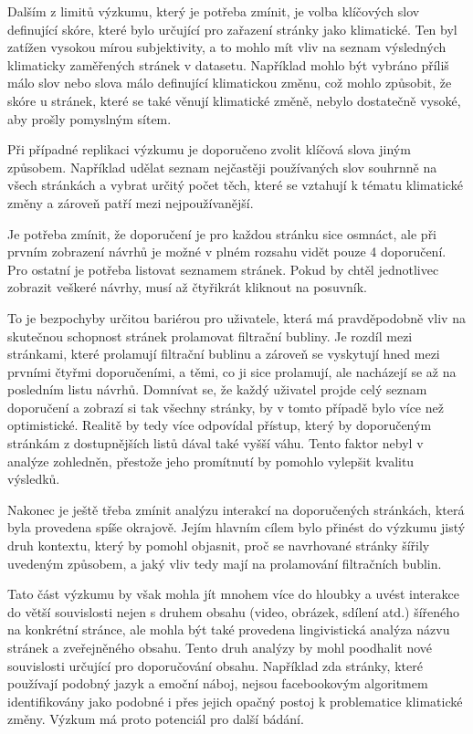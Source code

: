     Dalším z limitů výzkumu, který je potřeba zmínit, je volba klíčových slov definující skóre, které bylo určující pro zařazení stránky jako klimatické. Ten byl zatížen vysokou mírou subjektivity, a to mohlo mít vliv na seznam výsledných klimaticky zaměře\-ných stránek v datasetu. Například mohlo být vybráno příliš málo slov nebo slova málo definující klimatickou změnu, což mohlo způsobit, že skóre u stránek, které se také věnují klimatické změně, nebylo dostatečně vysoké, aby prošly pomyslným sítem. 

    Při případné replikaci výzkumu je doporučeno zvolit klíčová slova jiným způso\-bem. Napří\-klad udělat seznam nejčastěji používaných slov souhrnně na všech stránkách a vybrat určitý počet těch, které se vztahují k tématu klimatické změny a zároveň patří mezi nejpoužívanější. 
    
    Je potřeba zmínit, že doporučení je pro každou stránku sice osmnáct, ale při prvním zobrazení návrhů je možné v plném rozsahu vidět pouze 4 doporučení. Pro ostatní je potřeba listovat seznamem stránek. Pokud by chtěl jednotlivec zobrazit veškeré návrhy, musí až čtyřikrát kliknout na posuvník. 
    
    To je bezpochyby určitou bariérou pro uživatele, která má pravděpodobně vliv na skutečnou schopnost stránek prolamovat filtrační bubliny. Je rozdíl mezi stránkami, které prolamují filtrační bublinu a zároveň se vyskytují hned mezi prvními čtyřmi doporučeními, a těmi, co ji sice prolamují, ale nacházejí se až na posledním listu návrhů. Domnívat se, že každý uživatel projde celý seznam doporučení a zobrazí si tak všechny stránky, by v tomto případě bylo více než optimistické. Realitě by tedy více odpovídal přístup, který by doporučeným stránkám z dostupnějších listů dával také vyšší váhu. Tento faktor nebyl v analýze zohledněn, přestože jeho promítnutí by pomohlo vylepšit kvalitu výsledků. 
    
    Nakonec je ještě třeba zmínit analýzu interakcí na doporučených stránkách, která byla provedena spíše okrajově. Jejím hlavním cílem bylo přinést do výzkumu jistý druh kontextu, který by pomohl objasnit, proč se navrhované stránky šířily uvedeným způsobem, a jaký vliv tedy mají na prolamování filtračních bublin. 
    
    Tato část výzkumu by však mohla jít mnohem více do hloubky a uvést interakce do větší souvislosti nejen s druhem obsahu (video, obrázek, sdílení atd.) šířeného na konkrétní stránce, ale mohla být také provedena lingivistická analýza názvu stránek a zveřejněného obsahu. Tento druh analýzy by mohl poodhalit nové souvislosti určující pro doporučování obsahu. Například zda stránky, které používají podobný jazyk a emoční náboj, nejsou facebookovým algoritmem identifikovány jako podobné i přes jejich opačný postoj k problematice klimatické změny. Výzkum má proto potenciál pro další bádání. 